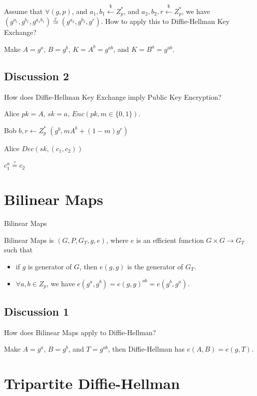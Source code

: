 Assume that $\forall (g, p)$, and $a_1,b_1 \stackrel{\$}{\gets} Z^*_p$, and $a_2,b_2,r \stackrel{\$}{\gets}Z^*_p$, we have $(g^{a_1}, g^{b_1}, g^{a_1b_1}) \stackrel{c}{\simeq} (g^{a_2}, g^{b_2}, g^r)$. How to apply this to Diffie-Hellman Key Exchange?


Make $A=g^a$, $B=g^b$, $K=A^b=g^{ab}$, and $K=B^a=g^{ab}$.


\subsection{Discussion 2}


How does Diffie-Hellman Key Exchange imply Public Key Encryption?


Alice
$pk = A$, $sk = a$, $Enc(pk, m \in \{0, 1\})$.

Bob
$b,r \gets Z^*_p$
$(g^b, mA^b+(1-m)g^r)$

Alice $Dec(sk, (c_1, c_2))$

$c_1^a \stackrel{?}{=} c_2$




\section{Bilinear Maps}

\begin{definition}{Bilinear Maps}

Bilinear Maps is $(G,P,G_T,g,e)$, where $e$ is an efficient function $G \times G \to G_T$ such that

\begin{itemize}
\item if $g$ is generator of $G$, then $e(g, g)$ is the generator of $G_T$.
\item $\forall a,b \in Z_p$, we have $e(g^a, g^b) = e(g, g)^{ab} = e(g^b, g^a)$.
\end{itemize}

\end{definition}

\subsection{Discussion 1}


How does Bilinear Maps apply to Diffie-Hellman?

Make $A=g^a$, $B=g^b$, and $T=g^{ab}$, then Diffie-Hellman has $e(A, B)=e(g, T)$.


\section{Tripartite Diffie-Hellman}


